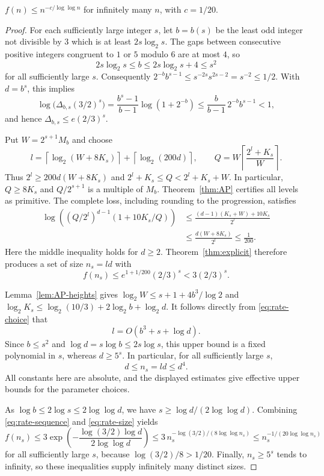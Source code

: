 \documentclass[12pt]{article}
\begin{document}
\begin{theorem}\label{thm:rate}
$f(n)\le n^{-c/\log\log n}$ for infinitely many $n$, with $c=1/20$.
\end{theorem}
\begin{proof}
For each sufficiently large integer $s$, let $b=b(s)$ be the least odd integer
not divisible by $3$ which is at least $2s\log_2s$.
The gaps between consecutive positive integers congruent to $1$ or $5$ modulo
$6$ are at most $4$, so
\[
2s\log_2s\le b\le2s\log_2s+4\le s^2
\]
for all sufficiently large $s$. Consequently
$2^{-b}b^{s-1}\le s^{-2s}s^{2s-2}=s^{-2}\le1/2$.
With $d=b^s$, this implies
\[
\log\bigl(\Delta_{b,s}(3/2)^s\bigr)
=\frac{b^s-1}{b-1}\log(1+2^{-b})
\le\frac{b}{b-1}\,2^{-b}b^{s-1}<1,
\]
and hence $\Delta_{b,s}\le e(2/3)^s$.

Put $W=2^{s+1}M_b$ and choose
\begin{equation}\label{eq:rate-choice}
l=\left\lceil\log_2(W+8K_s)\right\rceil
+\left\lceil\log_2(200d)\right\rceil,\qquad
Q=W\left\lceil\frac{2^l+K_s}{W}\right\rceil.
\end{equation}
Thus $2^l\ge200d(W+8K_s)$ and
$2^l+K_s\le Q<2^l+K_s+W$. In particular, $Q\ge8K_s$ and $Q/2^{s+1}$ is a
multiple of $M_b$. Theorem~\ref{thm:AP} certifies all levels as primitive.
The complete loss, including rounding to the progression, satisfies
\begin{align*}
\log\left((Q/2^l)^{d-1}(1+10K_s/Q)\right)
&\le\frac{(d-1)(K_s+W)+10K_s}{2^l}\\
&\le\frac{d(W+8K_s)}{2^l}\le\frac1{200}.
\end{align*}
Here the middle inequality holds for $d\ge2$.
Theorem~\ref{thm:explicit} therefore produces a set of size $n_s=ld$ with
\begin{equation}\label{eq:rate-sequence}
f(n_s)\le e^{1+1/200}(2/3)^s<3(2/3)^s.
\end{equation}

Lemma~\ref{lem:AP-heights} gives
$\log_2W\le s+1+4b^3/\log2$ and
$\log_2K_s\le\log_2(10/3)+2\log_2b+\log_2d$.
It follows directly from \eqref{eq:rate-choice} that
\[
l=O(b^3+s+\log d).
\]
Since $b\le s^2$ and $\log d=s\log b\le2s\log s$, this upper bound is a fixed
polynomial in $s$, whereas $d\ge5^s$.
In particular, for all sufficiently large $s$,
\begin{equation}\label{eq:rate-size}
d\le n_s=ld\le d^4.
\end{equation}
All constants here are absolute, and the displayed estimates give effective
upper bounds for the parameter choices.

As $\log b\le2\log s\le2\log\log d$, we have
$s\ge\log d/(2\log\log d)$.
Combining \eqref{eq:rate-sequence} and \eqref{eq:rate-size} yields
\[
f(n_s)\le3\exp\left(-\frac{\log(3/2)\log d}{2\log\log d}\right)
\le3\,n_s^{-\log(3/2)/(8\log\log n_s)}
\le n_s^{-1/(20\log\log n_s)}
\]
for all sufficiently large $s$, because $\log(3/2)/8>1/20$.
Finally, $n_s\ge5^s$ tends to infinity, so these inequalities supply infinitely
many distinct sizes.
\end{proof}
\end{document}
